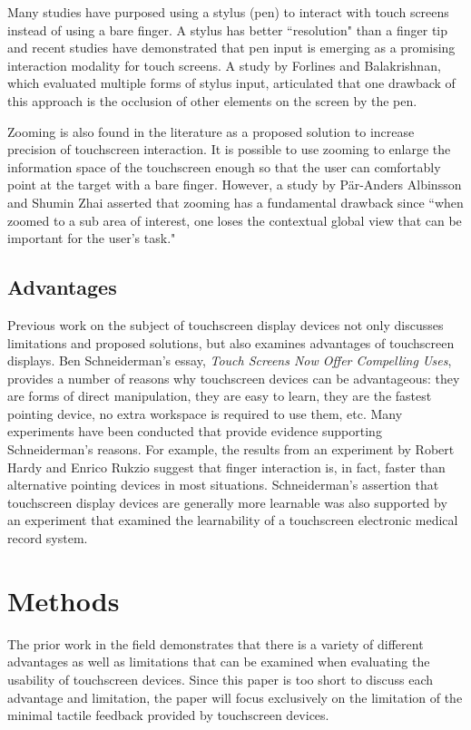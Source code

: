 \documentclass{article}
\begin{document}
Many studies have purposed using a stylus (pen) to interact with touch screens instead of using a bare finger. A stylus has better ``resolution" than a finger tip and recent studies have demonstrated that pen input is emerging as a promising interaction modality for touch screens.\cite{Bi} A study by Forlines and Balakrishnan, which evaluated multiple forms of stylus input, articulated that one drawback of this approach is the occlusion of other elements on the screen by the pen.\cite{Forlines}

Zooming is also found in the literature as a proposed solution to increase precision of touchscreen interaction. It is possible to use zooming to enlarge the information space of the touchscreen enough so that the user can comfortably point at the target with a bare finger. However, a study by P\"{a}r-Anders Albinsson and Shumin Zhai asserted that zooming has a fundamental drawback since ``when zoomed to a sub area of interest, one loses the contextual global view that can be important for the user's task."\cite{Albinsson} 

\subsection{Advantages}
Previous work on the subject of touchscreen display devices not only discusses limitations and proposed solutions, but also examines advantages of touchscreen displays. Ben Schneiderman's essay, \textit{Touch Screens Now Offer Compelling Uses}, provides a number of reasons why touchscreen devices can be advantageous: they are forms of direct manipulation, they are easy to learn, they are the fastest pointing device, no extra workspace is required to use them, etc. \cite{73754} Many experiments have been conducted that provide evidence supporting Schneiderman's reasons. For example, the results from an experiment by Robert Hardy and Enrico Rukzio suggest that finger interaction is, in fact, faster than alternative pointing devices in most situations.\cite{Hardy:2008:TIT:1409240.1409267} Schneiderman's assertion that touchscreen display devices are generally more learnable was also supported by an experiment that examined the learnability of a touchscreen electronic medical record system.\cite{Douglas:2011:SUL:2029976.2029990}


\section{Methods}
The prior work in the field demonstrates that there is a variety of different advantages as well as limitations that can be examined when evaluating the usability of touchscreen devices. Since this paper is too short to discuss each advantage and limitation, the paper will focus exclusively on the limitation of the minimal tactile feedback provided by touchscreen devices. 
\end{document}
